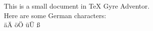 \documentclass{article}
\begin{document}
This is a small document in TeX Gyre Adventor.
\\
Here are some German characters:
\\
äÄ öÖ üÜ ß
\end{document}
